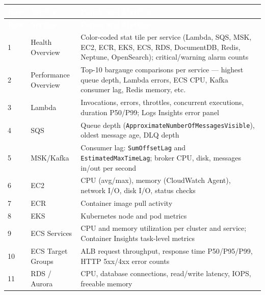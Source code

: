 \begin{tabularx}{\textwidth}{@{\hspace{\tabcolsep}}>{\centering\arraybackslash}p{}>{\raggedright\arraybackslash}p{}>{\raggedright\arraybackslash}X@{\hspace{\tabcolsep}}}
\caption{Grafana AMG Dashboard --- Row Structure} \label{tab:dashboard_rows} \\
\hline
\rowcolor{smubrand}\textcolor{white}{\textbf{Row}} & \textcolor{white}{\textbf{Service}} & \textcolor{white}{\textbf{Panels and Metrics}} \\
\hline
\endfirsthead
\hline
\rowcolor{smubrand}\textcolor{white}{\textbf{Row}} & \textcolor{white}{\textbf{Service}} & \textcolor{white}{\textbf{Panels and Metrics}} \\
\hline
\endhead
\hline
\endfoot
\rowcolor{tablerowA} 1 & Health Overview & Color-coded stat tile per service (Lambda, SQS, MSK, EC2, ECR, EKS, ECS, RDS, DocumentDB, Redis, Neptune, OpenSearch); critical/warning alarm counts \\
\rowcolor{tablerowB} 2 & Performance Overview & Top-10 bargauge comparisons per service --- highest queue depth, Lambda errors, ECS CPU, Kafka consumer lag, Redis memory, etc. \\
\rowcolor{tablerowA} 3 & Lambda & Invocations, errors, throttles, concurrent executions, duration P50/P99; Logs Insights error panel \\
\rowcolor{tablerowB} 4 & SQS & Queue depth (\texttt{ApproximateNumberOfMessagesVisible}), oldest message age, DLQ depth \\
\rowcolor{tablerowA} 5 & MSK/Kafka & Consumer lag: \texttt{SumOffsetLag} and \texttt{EstimatedMaxTimeLag}; broker CPU, disk, messages in/out per second \\
\rowcolor{tablerowB} 6 & EC2 & CPU (avg/max), memory (CloudWatch Agent), network I/O, disk I/O, status checks \\
\rowcolor{tablerowA} 7 & ECR & Container image pull activity \\
\rowcolor{tablerowB} 8 & EKS & Kubernetes node and pod metrics \\
\rowcolor{tablerowA} 9 & ECS Services & CPU and memory utilization per cluster and service; Container Insights task-level metrics \\
\rowcolor{tablerowB} 10 & ECS Target Groups & ALB request throughput, response time P50/P95/P99, HTTP 5xx/4xx error counts \\
\rowcolor{tablerowA} 11 & RDS / Aurora & CPU, database connections, read/write latency, IOPS, freeable memory \\

\end{tabularx}
